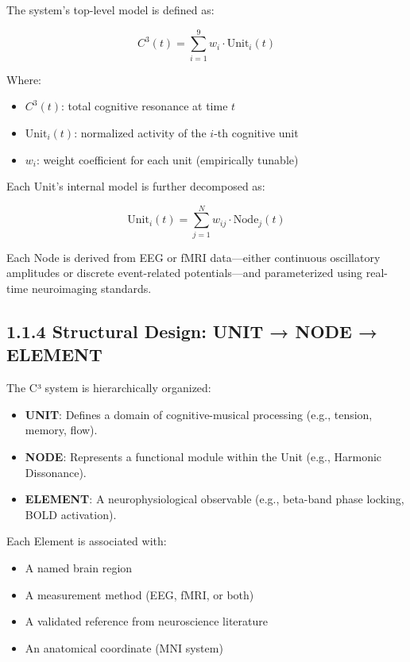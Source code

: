 \documentclass[10pt]{article}
\begin{document}
The system's top-level model is defined as:

\[
C^3(t) = \sum_{i=1}^{9} w_i \cdot \text{Unit}_i(t)
\]

Where:

\begin{itemize}
    \item $C^3(t)$: total cognitive resonance at time $t$
    \item $\text{Unit}_i(t)$: normalized activity of the $i$-th cognitive unit
    \item $w_i$: weight coefficient for each unit (empirically tunable)
\end{itemize}

Each Unit’s internal model is further decomposed as:

\[
\text{Unit}_i(t) = \sum_{j=1}^{N} w_{ij} \cdot \text{Node}_j(t)
\]

Each Node is derived from EEG or fMRI data—either continuous oscillatory amplitudes or discrete event-related potentials—and parameterized using real-time neuroimaging standards.

\subsection*{1.1.4 Structural Design: UNIT → NODE → ELEMENT}

The C³ system is hierarchically organized:

\begin{itemize}
    \item \textbf{UNIT}: Defines a domain of cognitive-musical processing (e.g., tension, memory, flow).
    \item \textbf{NODE}: Represents a functional module within the Unit (e.g., Harmonic Dissonance).
    \item \textbf{ELEMENT}: A neurophysiological observable (e.g., beta-band phase locking, BOLD activation).
\end{itemize}

Each Element is associated with:

\begin{itemize}
    \item A named brain region
    \item A measurement method (EEG, fMRI, or both)
    \item A validated reference from neuroscience literature
    \item An anatomical coordinate (MNI system)
\end{itemize}
\end{document}
